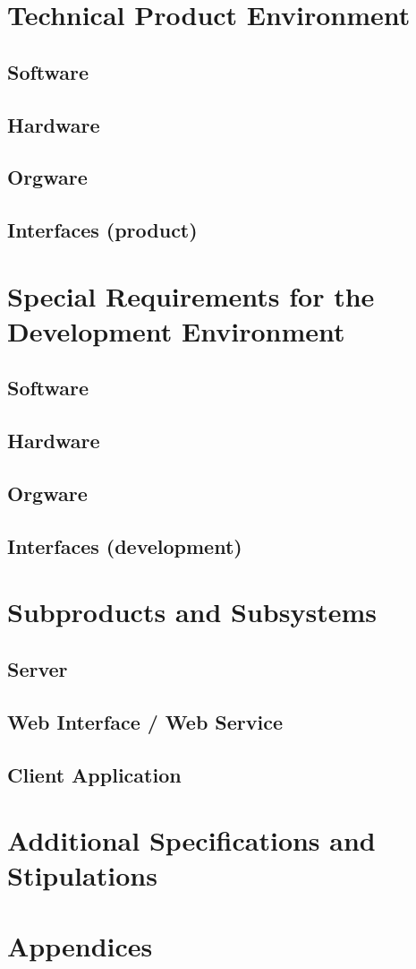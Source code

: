 \documentclass[11pt,a4paper,oneside,svgnames]{report}
\begin{document}
\chapter{Technical Product Environment}
\section{Software}
\section{Hardware}
\section{Orgware}
\section{Interfaces (product)}

\chapter{Special Requirements for the Development Environment}
\section{Software}
\section{Hardware}
\section{Orgware}
\section{Interfaces (development)}

\chapter{Subproducts and Subsystems}
\section{Server}
\section{Web Interface / Web Service}
\section{Client Application}

\chapter{Additional Specifications and Stipulations}
\chapter{Appendices}
\printglossaries
\end{document}
